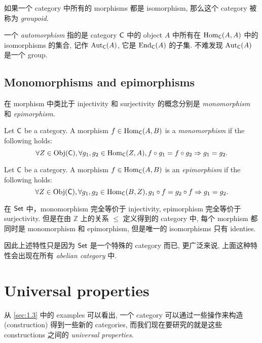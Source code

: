 \begin{eg}[Groupoid]\label{eg:1.4.6}
    如果一个 category 中所有的 morphisms 都是 isomorphism, 那么这个 category 被称为 \emph{groupoid}.
\end{eg}

一个 \emph{automorphism} 指的是 category \(\operatorname{\mathsf{C}}\) 中的 object \(A\) 中所有在 \(\operatorname{Hom}_{\operatorname{\mathsf{C}}}(A, A)\) 中的 isomorphisms 的集合, 记作 \(\operatorname{Aut}_{\operatorname{\mathsf{C}}}(A)\), 它是 \(\operatorname{End}_{\operatorname{\mathsf{C}}}(A)\) 的子集. 不难发现 \(\operatorname{Aut}_{\operatorname{\mathsf{C}}}(A)\) 是一个 group.

\subsection{Monomorphisms and epimorphisms}\label{sec:1.4.2}

在 morphism 中类比于 injectivity 和 surjectivity 的概念分别是 \emph{monomorphism} 和 \emph{epimorphism}.

\begin{definition}[Monomorphism]\label{def:monomorphism}
    Let \(\operatorname{\mathsf{C}}\) be a category. A morphism \(f \in \operatorname{Hom}_{\operatorname{\mathsf{C}}}(A, B)\) is a \emph{monomorphism} if the following holds:
    \[
        \forall Z \in \operatorname{Obj}(\operatorname{\mathsf{C}}), \forall g_1, g_2 \in \operatorname{Hom}_{\operatorname{\mathsf{C}}}(Z, A), f \circ g_1 = f \circ g_2 \Rightarrow g_1 = g_2.
    \]
\end{definition}

\begin{definition}[Epimorphism]\label{def:epimorphism}
    Let \(\operatorname{\mathsf{C}}\) be a category. A morphism \(f \in \operatorname{Hom}_{\operatorname{\mathsf{C}}}(A, B)\) is an \emph{epimorphism} if the following holds:
    \[
        \forall Z \in \operatorname{Obj}(\operatorname{\mathsf{C}}), \forall g_1, g_2 \in \operatorname{Hom}_{\operatorname{\mathsf{C}}}(B, Z), g_1 \circ f = g_2 \circ f \Rightarrow g_1 = g_2.
    \]
\end{definition}

在 \(\operatorname{\mathsf{Set}}\) 中，monomorphism 完全等价于 injectivity, epimorphism 完全等价于 surjectivity. 但是在由 \(\mathbb{Z}\) 上的关系 \(\le\) 定义得到的 category 中, 每个 morphism 都同时是 monomorphism 和 epimorphism, 但是唯一的 isomorphisms 只有 identies.

因此上述特性只是因为 \(\operatorname{\mathsf{Set}}\) 是一个特殊的 category 而已, 更广泛来说, 上面这种特性会出现在所有 \emph{abelian category} 中.

\section{Universal properties}\label{sec:1.5}

从 \autoref{sec:1.3} 中的 examples 可以看出, 一个 category 可以通过一些操作来构造 (construction) 得到一些新的 categories, 而我们现在要研究的就是这些 constructions 之间的 \emph{universal properties}.

